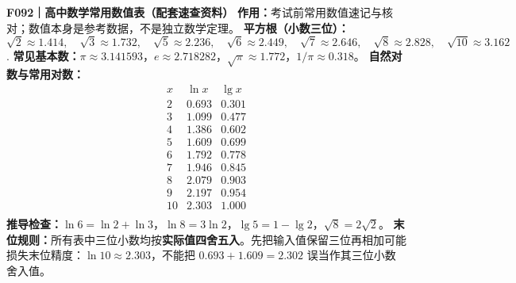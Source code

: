 \textbf{F092｜高中数学常用数值表（配套速查资料）}
\textbf{作用：}考试前常用数值速记与核对；数值本身是参考数据，不是独立数学定理。
\textbf{平方根（小数三位）：}\[\sqrt{2}\approx1.414,\quad \sqrt{3}\approx1.732,\quad \sqrt{5}\approx2.236,\quad \sqrt{6}\approx2.449,\quad \sqrt{7}\approx2.646,\quad \sqrt{8}\approx2.828,\quad \sqrt{10}\approx3.162\].
\textbf{常见基本数：}$\pi\approx3.141593$，$e\approx2.718282$，$\sqrt\pi\approx1.772$，$1/\pi\approx0.318$。
\textbf{自然对数与常用对数：}\[\begin{array}{c|c|c}
x & \ln x & \lg x\\\hline
2 & 0.693 & 0.301\\
3 & 1.099 & 0.477\\
4 & 1.386 & 0.602\\
5 & 1.609 & 0.699\\
6 & 1.792 & 0.778\\
7 & 1.946 & 0.845\\
8 & 2.079 & 0.903\\
9 & 2.197 & 0.954\\
10 & 2.303 & 1.000\\\end{array}\]
\textbf{推导检查：}$\ln6=\ln2+\ln3$，$\ln8=3\ln2$，$\lg5=1-\lg2$，$\sqrt8=2\sqrt2$。
\textbf{末位规则：}所有表中三位小数均按\textbf{实际值四舍五入}。先把输入值保留三位再相加可能损失末位精度：$\ln10\approx2.303$，不能把 $0.693+1.609=2.302$ 误当作其三位小数舍入值。
